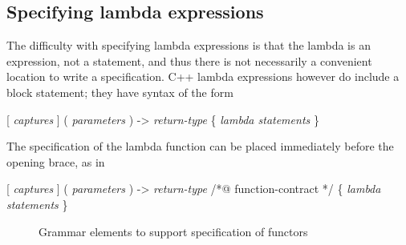 \subsection{Specifying lambda expressions}

The difficulty with specifying lambda expressions is that the lambda is an expression, not a statement, and thus there is not necessarily a convenient location to write a specification.
C++ lambda expressions however do include a block statement; they have syntax of the form\\
\centerline{ [ \textit{captures} ] ( \textit{parameters} ) -> \textit{return-type}  \{ \textit{lambda statements} \} }
The specification of the lambda function can be placed immediately before the opening brace, as in \\
\centerline{ [ \textit{captures} ] ( \textit{parameters} ) -> \textit{return-type} /*@ function-contract */ \{ \textit{lambda statements} \} }

\begin{figure}
\begin{cadre}

\end{cadre}
\caption{Grammar elements to support specification of functors}
\label{fig:gram:functional}
\end{figure}
